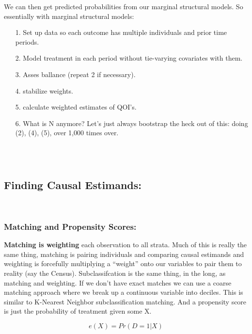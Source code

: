 \documentclass[12pt]{article}\usepackage[]{graphicx}\usepackage[]{color}
\begin{document}
\begin{flushleft}
We can then get predicted probabilities from our marginal structural models. So essentially with marginal structural models:

\begin{itemize}
\item[1.] Set up data so each outcome has multiple individuals and prior time periods.
\item[2.] Model treatment in each period without tie-varying covariates with them.
\item[3.] Asses ballance (repeat 2 if necessary).
\item[4.] stabilize weights.
\item[5.] calculate weighted estimates of QOI's.
\item[6.] What is N anymore? Let's just always bootstrap the heck out of this: doing (2), (4), (5), over 1,000 times over.
\end{itemize}

\hfill \\
\hfill \\


\subsection{Finding Causal Estimands:}

\hfill \\

\subsubsection{Matching and Propensity Scores:}

\textbf{Matching is weighting} each observation to all strata. Much of this is really the same thing, matching is pairing individuals and comparing causal estimands and weighting is forcefully multiplying a ``weight'' onto our variables to pair them to reality (say the Census). Subclassifcation is the same thing, in the long, as matching and weighting. If we don't have exact matches we can use a coarse matching approach where we break up a continuous variable into deciles. This is similar to K-Nearest Neighbor subclassification matching.  And a propensity score is just the probability of treatment given some X. 

\begin{equation}
e(X) = Pr(D = 1|X)
\end{equation}


\end{flushleft}
\end{document}
